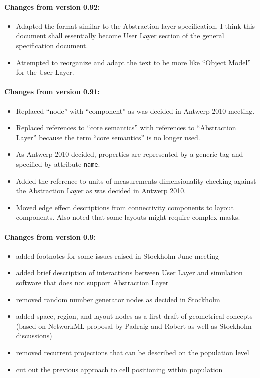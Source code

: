 \documentclass{article}
\begin{document}
\paragraph{Changes from version 0.92:}
\begin{itemize}
\item Adapted the format similar to the Abstraction layer specification.
I think this document shall essentially become User Layer section of the
general specification document.
\item Attempted to reorganize and adapt the text to be more like ``Object
Model'' for the User Layer.
\end{itemize}

\paragraph{Changes from version 0.91:}
\begin{itemize}
\item Replaced ``node'' with ``component'' as was decided in Antwerp 2010
meeting.
\item Replaced references to ``core semantics'' with references to
``Abstraction Layer'' because the term ``core semantics'' is no longer used.
\item As Antwerp 2010 decided, properties are represented by a generic
tag and specified by attribute {\tt name}.
\item Added the reference to units of measurements dimensionality checking
against the Abstraction Layer as was decided in Antwerp 2010.
\item Moved edge effect descriptions from connectivity components to layout
components. Also noted that some layouts might require complex masks.
\end{itemize}

\paragraph{Changes from version 0.9:}
\begin{itemize}
\item added footnotes for some issues raised in Stockholm June meeting
\item added brief description of interactions between User Layer and
simulation software that does not support Abstraction Layer
\item removed random number generator nodes as decided in Stockholm
\item added space, region, and layout nodes as a first draft of geometrical
concepts (based on NetworkML proposal by Padraig and Robert as well as
Stockholm discussions)
\item removed recurrent projections that can be described on the population
level
\item cut out the previous approach to cell positioning within population
\end{itemize}
\newpage
\end{document}
